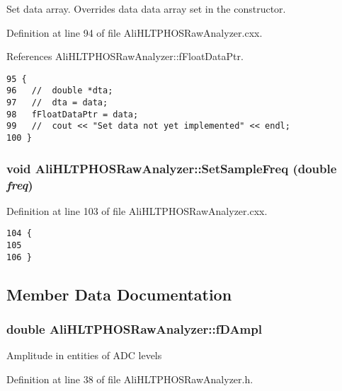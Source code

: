 Set data array. Overrides data data array set in the constructor. 

Definition at line 94 of file Ali\-HLTPHOSRaw\-Analyzer.cxx.

References Ali\-HLTPHOSRaw\-Analyzer::f\-Float\-Data\-Ptr.

\footnotesize\begin{verbatim}95 {
96   //  double *dta;
97   //  dta = data;
98   fFloatDataPtr = data;
99   //  cout << "Set data not yet implemented" << endl;
100 }
\end{verbatim}\normalsize 


\subsubsection{\setlength{\rightskip}{0pt plus 5cm}void Ali\-HLTPHOSRaw\-Analyzer::Set\-Sample\-Freq (double {\em freq})\hspace{0.3cm}{\tt  [inherited]}}\label{classAliHLTPHOSRawAnalyzer_AliHLTPHOSRawAnalyzerPeakFindera13}




Definition at line 103 of file Ali\-HLTPHOSRaw\-Analyzer.cxx.

\footnotesize\begin{verbatim}104 {
105 
106 }
\end{verbatim}\normalsize 




\subsection{Member Data Documentation}
\subsubsection{\setlength{\rightskip}{0pt plus 5cm}double {\bf Ali\-HLTPHOSRaw\-Analyzer::f\-DAmpl}\hspace{0.3cm}{\tt  [protected, inherited]}}\label{classAliHLTPHOSRawAnalyzer_AliHLTPHOSRawAnalyzerPeakFinderp6}


Amplitude in entities of ADC levels 

Definition at line 38 of file Ali\-HLTPHOSRaw\-Analyzer.h.
